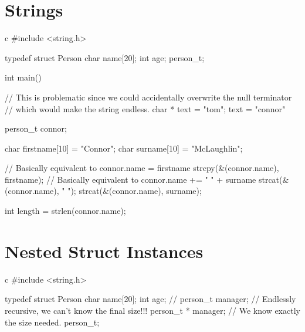 \section{Strings}\label{sec:strings_advanced}

\begin{code}{c}
    #include <string.h>

    typedef struct Person {
        char name[20];
        int age;
    } person_t;

    int main() {
        // This is problematic since we could accidentally overwrite the null terminator
        // which would make the string endless.
        char * text = "tom";
        text = "connor"

        person_t connor;

        char firstname[10] = "Connor";
        char surname[10] = "McLaughlin";

        // Basically equivalent to connor.name = firstname
        strcpy(&(connor.name), firstname);
        // Basically equivalent to connor.name += " " + surname
        strcat(&(connor.name), " ");
        strcat(&(connor.name), surname);

        int length = strlen(connor.name);
    }
\end{code}

\section{Nested Struct Instances}\label{sec:nested_struct_instances}

\begin{code}{c}
    #include <string.h>

    typedef struct Person {
        char name[20];
        int age;
        // person_t manager; // Endlessly recursive, we can't know the final size!!!
        person_t * manager; // We know exactly the size needed.
    } person_t;
\end{code}

